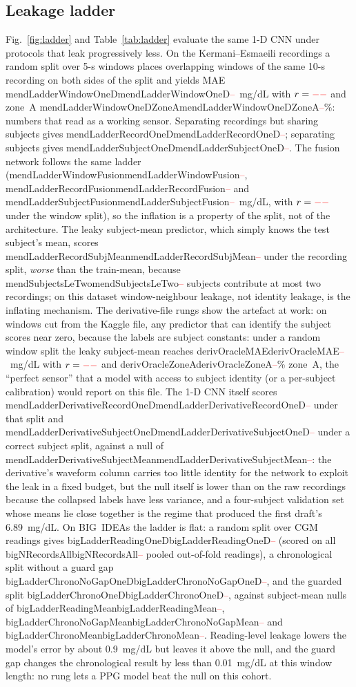\documentclass[journal]{IEEEtran}
\newcommand{\m}[1]{\ifcsname #1\endcsname\csname #1\endcsname\else\textcolor{red}{--}\fi}
\begin{document}
\subsection{Leakage ladder}
\label{sec:ladder}
Fig.~\ref{fig:ladder} and Table~\ref{tab:ladder} evaluate the same 1-D CNN
under protocols that leak progressively less.  On the Kermani--Esmaeili
recordings a random split over 5-s windows places overlapping windows of the
same 10-s recording on both sides of the split and yields MAE
\m{mendLadderWindowOneD}~mg/dL with $r=\m{mendLadderWindowOneDR}$ and zone~A
\m{mendLadderWindowOneDZoneA}\%: numbers
that read as a working sensor.  Separating recordings but sharing subjects
gives \m{mendLadderRecordOneD}; separating subjects gives
\m{mendLadderSubjectOneD}.  The fusion network follows the same ladder
(\m{mendLadderWindowFusion}, \m{mendLadderRecordFusion} and
\m{mendLadderSubjectFusion}~mg/dL, with $r=\m{mendLadderWindowFusionR}$ under
the window split),
so the inflation is a property of the split, not of the architecture.  The leaky subject-mean predictor, which simply
knows the test subject's mean, scores \m{mendLadderRecordSubjMean} under the
recording split, \emph{worse} than the train-mean, because \m{mendSubjectsLeTwo} subjects
contribute at most two recordings; on this dataset window-neighbour leakage,
not identity leakage, is the inflating mechanism.  The derivative-file rungs
show the artefact at work: on windows cut from the Kaggle file, any
predictor that can identify the subject scores near zero, because the labels
are subject constants: under a random window split the leaky subject-mean
reaches \m{derivOracleMAE}~mg/dL with $r=\m{derivOracleR}$ and
\m{derivOracleZoneA}\% zone~A, the ``perfect sensor'' that a model with access to subject identity
(or a per-subject calibration) would report on this file.  The 1-D CNN
itself scores \m{mendLadderDerivativeRecordOneD} under that split and
\m{mendLadderDerivativeSubjectOneD} under a correct subject split, against a
null of \m{mendLadderDerivativeSubjectMean}: the derivative's waveform column
carries too little identity for the network to exploit the leak in a fixed
budget, but the null itself is lower than on the raw recordings because the
collapsed labels have less variance, and a four-subject validation set whose
means lie close together is the regime that produced the first draft's
6.89~mg/dL.  On BIG~IDEAs the ladder is flat: a random split over CGM
readings gives \m{bigLadderReadingOneD} (scored on all
\m{bigNRecordsAll} pooled out-of-fold readings), a chronological split
without a guard gap \m{bigLadderChronoNoGapOneD}, and the guarded split
\m{bigLadderChronoOneD}, against subject-mean nulls of
\m{bigLadderReadingMean}, \m{bigLadderChronoNoGapMean} and
\m{bigLadderChronoMean}.  Reading-level leakage lowers the model's error by
about 0.9~mg/dL but leaves it above the null, and the guard gap changes the
chronological result by less than 0.01~mg/dL at this window length: no rung
lets a PPG model beat the null on this cohort.
\end{document}
